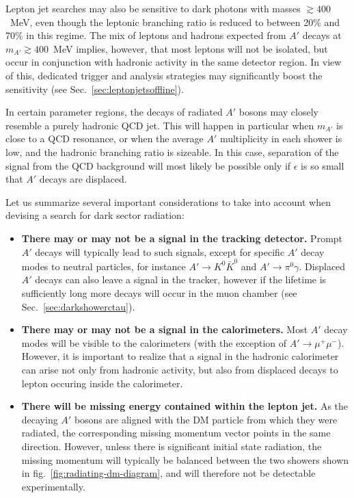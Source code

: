 Lepton jet searches may also be sensitive to dark photons
with masses $\gtrsim 400$~MeV, even though the leptonic branching ratio is reduced
to between 20\% and 70\% in this regime. The mix of leptons and hadrons
expected from $A'$ decays at $m_{A'} \gtrsim 400$~MeV implies, however,
that most leptons will not be isolated, but occur in conjunction with hadronic
activity in the same detector region.  In view of this, dedicated trigger and
analysis strategies may significantly boost the sensitivity (see Sec.~\ref{sec:leptonjetsoffline}).

In certain parameter regions, the decays of radiated $A'$ bosons may closely
resemble a purely hadronic QCD jet. This will happen in particular when $m_{A'}$
is close to a QCD resonance, or when the average $A'$ multiplicity in each
shower is low, and the hadronic branching ratio is sizeable. In this case,
separation of the signal from the QCD background will most likely be possible
only if $\epsilon$ is so small that $A'$ decays are displaced.

Let us summarize several important considerations to take into account when
devising a search for dark sector radiation:
\begin{itemize}
  \item {\bf There may or may not be a signal in the tracking detector.}
    Prompt $A'$ decays will typically lead to such signals, except for specific
    $A'$ decay modes to neutral particles, for instance $A' \to K^0 \bar{K}^0$
    and $A' \to \pi^0 \gamma$. Displaced $A'$ decays can also leave a signal in the tracker,
    however if the lifetime is sufficiently long more decays will occur in the muon chamber (see Sec.~\ref{sec:darkshowerctau}).

  \item {\bf There may or may not be a signal in the calorimeters.} Most $A'$
    decay modes will be visible to the calorimeters (with the exception of $A'
    \to \mu^+ \mu^-$). However, it is important to realize that a signal in the
    hadronic calorimeter can arise not only from hadronic activity, but also
    from displaced decays to lepton occuring inside the calorimeter.

  \item {\bf There will be missing energy contained within the lepton jet.}
    As the decaying $A'$ bosons are aligned with the DM particle from which
    they were radiated, the corresponding missing momentum vector points in
    the same direction. However, unless there is significant initial
    state radiation, the missing momentum will typically be balanced between
    the two showers shown in fig.~\ref{fig:radiating-dm-diagram}, and
    will therefore not be detectable experimentally.
\end{itemize}

